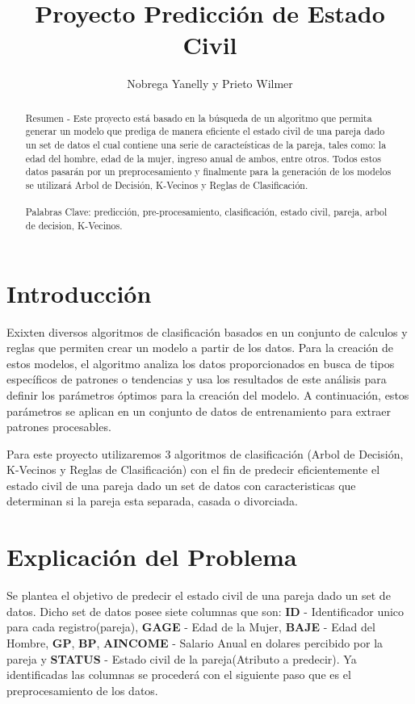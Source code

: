 \documentclass[twocolumn,showpacs,%
  nofootinbib,aps,superscriptaddress,%
  eqsecnum,prd,notitlepage,showkeys,10pt]{revtex4-1}
\begin{document}
\title{Proyecto Predicción de Estado Civil}
\author{Nobrega Yanelly y Prieto Wilmer}


\begin{abstract}
Resumen -
Este proyecto está basado en la búsqueda de un algoritmo que permita generar un modelo que prediga de manera eficiente el estado civil de una pareja dado un set de datos el cual contiene una serie de caracteísticas de la pareja, tales como: la edad del hombre, edad de la mujer, ingreso anual de ambos, entre otros. Todos estos datos pasarán por un preprocesamiento y finalmente para la generación de los modelos se utilizará Arbol de Decisión, K-Vecinos y Reglas de Clasificación.   
\\ \\
Palabras Clave: predicción, pre-procesamiento, clasificación, estado civil, pareja, arbol de decision, K-Vecinos.
\end{abstract}

\maketitle

\section{Introducción}
Exixten diversos algoritmos de clasificación  basados en un conjunto de calculos y reglas que permiten crear un modelo a partir de los datos. Para la creación de estos modelos, el algoritmo analiza los datos proporcionados en busca de tipos específicos de patrones o tendencias y usa los resultados de este análisis para definir los parámetros óptimos para la creación del modelo. A continuación, estos parámetros se aplican en  un conjunto de datos de entrenamiento para extraer patrones procesables. 

Para este proyecto utilizaremos 3 algoritmos de clasificación (Arbol de Decisión,  K-Vecinos y Reglas de Clasificación) con el fin de predecir eficientemente el estado civil de una pareja dado un set de datos con caracteristicas que determinan si la pareja esta separada, casada o divorciada.

\section{Explicación del Problema}
Se plantea el objetivo de predecir el estado civil de una pareja dado un set de datos. Dicho set de datos posee siete columnas que son: \textbf{ID} - Identificador unico para cada registro(pareja), \textbf{GAGE} - Edad de la Mujer, \textbf{BAJE} - Edad del Hombre, \textbf{GP}, \textbf{BP}, \textbf{AINCOME} - Salario Anual en dolares percibido por la pareja y \textbf{STATUS} - Estado civil de la pareja(Atributo a predecir). Ya identificadas las columnas se procederá con el siguiente paso que es el preprocesamiento de los datos.
\end{document}

